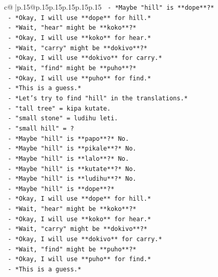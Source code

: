 \documentclass{article}
\begin{document}
{\begin{supertabular}{c@{$\;$}|p{.15\linewidth}@{}p{.15\linewidth}p{.15\linewidth}p{.15\linewidth}p{.15\linewidth}p{.15\linewidth}}
{{{\texttt{       {-} *Maybe "hill" is **dope**?*} \\
\texttt{       {-} *Okay, I will use **dope** for hill.*} \\
\texttt{       {-} *Wait, "hear" might be **koko**?*} \\
\texttt{       {-} *Okay, I will use **koko** for hear.*} \\
\texttt{       {-} *Wait, "carry" might be **dokivo**?*} \\
\texttt{       {-} *Okay, I will use **dokivo** for carry.*} \\
\texttt{       {-} *Wait, "find" might be **puho**?*} \\
\texttt{       {-} *Okay, I will use **puho** for find.*} \\
\texttt{       {-} *This is a guess.*} \\
\texttt{       {-} *Let's try to find "hill" in the translations.*} \\
\texttt{       {-} "tall tree" = kipa kutate.} \\
\texttt{       {-} "small stone" = ludihu leti.} \\
\texttt{       {-} "small hill" = ?} \\
\texttt{       {-} *Maybe "hill" is **papo**?* No.} \\
\texttt{       {-} *Maybe "hill" is **pikale**?* No.} \\
\texttt{       {-} *Maybe "hill" is **lalo**?* No.} \\
\texttt{       {-} *Maybe "hill" is **kutate**?* No.} \\
\texttt{       {-} *Maybe "hill" is **ludihu**?* No.} \\
\texttt{       {-} *Maybe "hill" is **dope**?*} \\
\texttt{       {-} *Okay, I will use **dope** for hill.*} \\
\texttt{       {-} *Wait, "hear" might be **koko**?*} \\
\texttt{       {-} *Okay, I will use **koko** for hear.*} \\
\texttt{       {-} *Wait, "carry" might be **dokivo**?*} \\
\texttt{       {-} *Okay, I will use **dokivo** for carry.*} \\
\texttt{       {-} *Wait, "find" might be **puho**?*} \\
\texttt{       {-} *Okay, I will use **puho** for find.*} \\
\texttt{       {-} *This is a guess.*} \\
}}}
\end{supertabular}}
\end{document}
